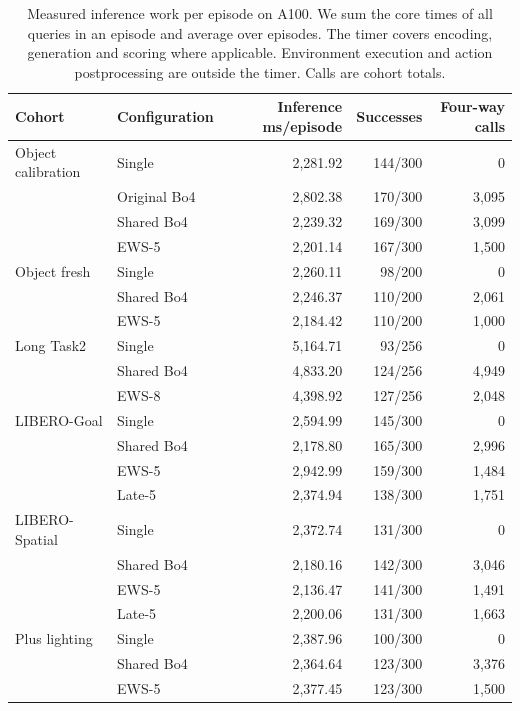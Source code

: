 \begin{table}[t]
\centering\small
\caption{Measured inference work per episode on A100. We sum the core times of all queries in an episode and average over episodes. The timer covers encoding, generation and scoring where applicable. Environment execution and action postprocessing are outside the timer. Calls are cohort totals.}
\label{tab:episode-cost}
\begin{tabular}{@{}llrrr@{}}\toprule
Cohort & Configuration & Inference ms/episode & Successes & Four-way calls \\ \midrule
Object calibration & Single & 2,281.92 & 144/300 & 0 \\
 & Original Bo4 & 2,802.38 & 170/300 & 3,095 \\
 & Shared Bo4 & 2,239.32 & 169/300 & 3,099 \\
 & EWS-5 & 2,201.14 & 167/300 & 1,500 \\
\addlinespace
Object fresh & Single & 2,260.11 & 98/200 & 0 \\
 & Shared Bo4 & 2,246.37 & 110/200 & 2,061 \\
 & EWS-5 & 2,184.42 & 110/200 & 1,000 \\
\addlinespace
Long Task2 & Single & 5,164.71 & 93/256 & 0 \\
 & Shared Bo4 & 4,833.20 & 124/256 & 4,949 \\
 & EWS-8 & 4,398.92 & 127/256 & 2,048 \\
\addlinespace
LIBERO-Goal & Single & 2,594.99 & 145/300 & 0 \\
 & Shared Bo4 & 2,178.80 & 165/300 & 2,996 \\
 & EWS-5 & 2,942.99 & 159/300 & 1,484 \\
 & Late-5 & 2,374.94 & 138/300 & 1,751 \\
\addlinespace
LIBERO-Spatial & Single & 2,372.74 & 131/300 & 0 \\
 & Shared Bo4 & 2,180.16 & 142/300 & 3,046 \\
 & EWS-5 & 2,136.47 & 141/300 & 1,491 \\
 & Late-5 & 2,200.06 & 131/300 & 1,663 \\
\addlinespace
Plus lighting & Single & 2,387.96 & 100/300 & 0 \\
 & Shared Bo4 & 2,364.64 & 123/300 & 3,376 \\
 & EWS-5 & 2,377.45 & 123/300 & 1,500 \\
\bottomrule
\end{tabular}
\end{table}

